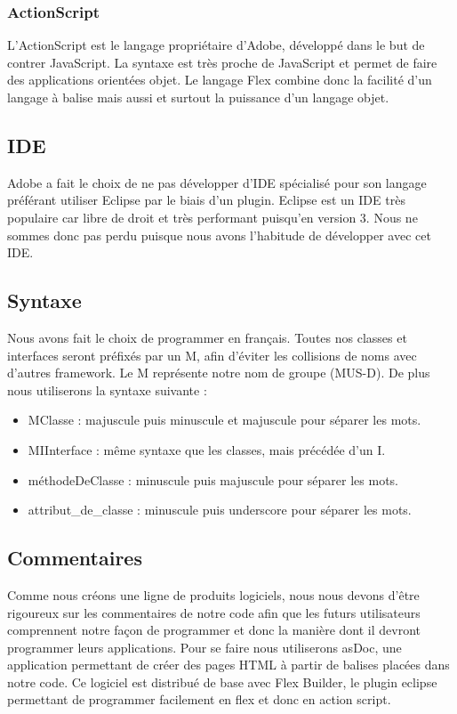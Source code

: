 \documentclass{article}
\begin{document}
		\subsubsection{ActionScript}
			L'ActionScript est le langage propriétaire d'Adobe, développé dans le but de contrer JavaScript. La syntaxe est très proche de JavaScript et permet de faire des applications orientées objet. Le langage Flex combine donc la facilité d'un langage à balise mais aussi et surtout la puissance d'un langage objet.
	\subsection{IDE}
		Adobe a fait le choix de ne pas développer d'IDE spécialisé pour son langage préférant utiliser Eclipse par le biais d'un plugin. Eclipse est un IDE très populaire car libre de droit et très performant puisqu'en version 3. Nous ne sommes donc pas perdu puisque nous avons l'habitude de développer avec cet IDE.
	\subsection{Syntaxe}
		Nous avons fait le choix de programmer en français. Toutes nos classes et interfaces seront préfixés par un M, afin d'éviter les collisions de noms avec d'autres framework. Le M représente notre nom de groupe (MUS-D).
		\ident De plus nous utiliserons la syntaxe suivante :
		\begin{itemize}
			\item MClasse : majuscule puis minuscule et majuscule pour séparer les mots.
			\item MIInterface : même syntaxe que les classes, mais précédée d'un I.
			\item méthodeDeClasse : minuscule puis majuscule pour séparer les mots.
			\item attribut\_de\_classe : minuscule puis underscore pour séparer les mots.
		\end{itemize}
		
	\subsection{Commentaires}
		Comme nous créons une ligne de produits logiciels, nous nous devons d'être rigoureux sur les commentaires de notre code afin que les futurs utilisateurs comprennent notre façon de programmer et donc la manière dont il devront programmer leurs applications.
		\indent Pour se faire nous utiliserons asDoc, une application permettant de créer des pages HTML à partir de balises placées dans notre code. Ce logiciel est distribué de base avec Flex Builder, le plugin eclipse permettant de programmer facilement en flex et donc en action script.
\end{document}
